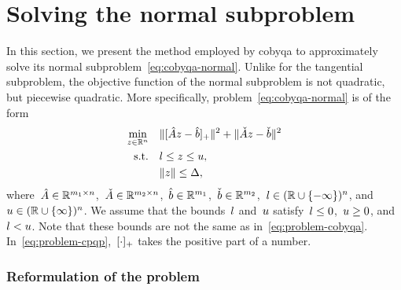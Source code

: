 
\section{Solving the normal subproblem}
\label{sec:cobyqa-normal}

In this section, we present the method employed by \gls{cobyqa} to approximately solve its normal subproblem~\cref{eq:cobyqa-normal}.
Unlike for the tangential subproblem, the objective function of the normal subproblem is not quadratic, but piecewise quadratic.
More specifically, problem~\cref{eq:cobyqa-normal} is of the form
\begin{subequations}
    \label{eq:problem-cpqp}
    \begin{align}
        \min_{z \in \R^n}   & \quad \norm{\posp{\hat{A} z - \hat{b}}}^2 + \norm{\check{A} z - \check{b}}^2\\
        \text{s.t.}         & \quad \xl \le z \le \xu,\\
                            & \quad \norm{z} \le \rad,
    \end{align}
\end{subequations}
where~$\hat{A} \in \mathbb{R}^{m_1 \times n}$,~$\check{A} \in \mathbb{R}^{m_2 \times n}$,~$\hat{b} \in \mathbb{R}^{m_1}$,~$\check{b} \in \mathbb{R}^{m_2}$,~$l \in (\mathbb{R} \cup \{-\infty\})^n$, and~$u \in (\mathbb{R} \cup \{\infty\})^n$.
We assume that the bounds~$l$ and~$u$ satisfy~$l \le 0$,~$u \ge 0$, and~$l < u$.
Note that these bounds are not the same as in~\cref{eq:problem-cobyqa}.
In~\cref{eq:problem-cpqp},~$[\cdot]_+$ takes the positive part of a number.

\subsubsection{Reformulation of the problem}

